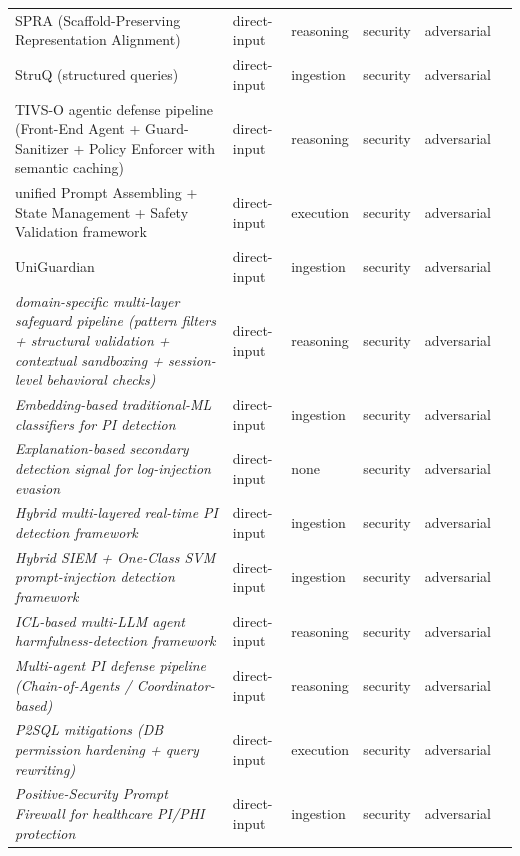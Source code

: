 \begin{longtable}{@{}>{\raggedright\arraybackslash}p{}lllll@{}}
SPRA (Scaffold-Preserving Representation Alignment) & direct-input & reasoning & security & adversarial & \cite{shao-2026-mitigating} \\
StruQ (structured queries) & direct-input & ingestion & security & adversarial & \cite{chen-2024-struq} \\
TIVS-O agentic defense pipeline (Front-End Agent + Guard-Sanitizer + Policy Enforcer with semantic caching) & direct-input & reasoning & security & adversarial & \cite{gosmar-2026-prompt} \\
unified Prompt Assembling + State Management + Safety Validation framework & direct-input & execution & security & adversarial & \cite{zhang-2025-enhancing} \\
UniGuardian & direct-input & ingestion & security & adversarial & \cite{lin-2025-uniguardian} \\
\emph{domain-specific multi-layer safeguard pipeline (pattern filters + structural validation + contextual sandboxing + session-level behavioral checks)} & direct-input & reasoning & security & adversarial & \cite{maiorano-2026-evaluating} \\
\emph{Embedding-based traditional-ML classifiers for PI detection} & direct-input & ingestion & security & adversarial & \cite{ayub-2024-embeddingbased} \\
\emph{Explanation-based secondary detection signal for log-injection evasion} & direct-input & none & security & adversarial & \cite{landauer-2026-just} \\
\emph{Hybrid multi-layered real-time PI detection framework} & direct-input & ingestion & security & adversarial & \cite{prakash-2026-hybrid} \\
\emph{Hybrid SIEM + One-Class SVM prompt-injection detection framework} & direct-input & ingestion & security & adversarial & \cite{alshammari-2026-detecting} \\
\emph{ICL-based multi-LLM agent harmfulness-detection framework} & direct-input & reasoning & security & adversarial & \cite{sato-2026-addressing} \\
\emph{Multi-agent PI defense pipeline (Chain-of-Agents / Coordinator-based)} & direct-input & reasoning & security & adversarial & \cite{hossain-2025-multiagent} \\
\emph{P2SQL mitigations (DB permission hardening + query rewriting)} & direct-input & execution & security & adversarial & \cite{pedro-2023-prompt} \\
\emph{Positive-Security Prompt Firewall for healthcare PI/PHI protection} & direct-input & ingestion & security & adversarial & \cite{schwoebel-2026-injection} \\

\end{longtable}
